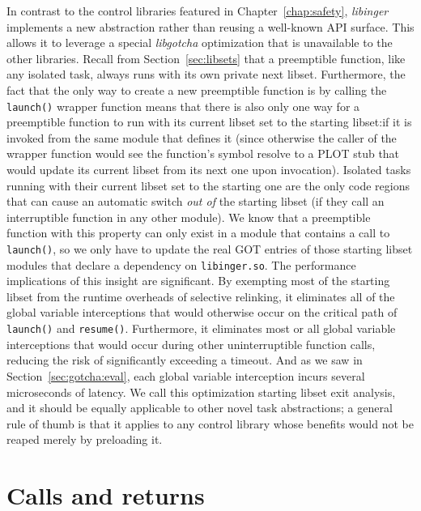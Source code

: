 In contrast to the control libraries featured in Chapter~\ref{chap:safety},
\textit{libinger} implements a new abstraction rather than reusing a well-known API
surface.  This allows it to leverage a special \textit{libgotcha} optimization that
is unavailable to the other libraries.  Recall from Section~\ref{sec:libsets} that a
preemptible function, like any isolated task, always runs with its own private next
libset.  Furthermore, the fact that the only way to create a new preemptible function
is by calling the \texttt{launch()} wrapper function means that there is also only
one way for a preemptible function to run with its current libset set to the starting
libset:\@ if it is invoked from the same module that defines it (since otherwise the
caller of the wrapper function would see the function's symbol resolve to a PLOT stub
that would update its current libset from its next one upon invocation).  Isolated
tasks running with their current libset set to the starting one are the only code
regions that can cause an automatic switch \textit{out of} the starting libset (if
they call an interruptible function in any other module).  We know that a preemptible
function with this property can only exist in a module that contains a call to
\texttt{launch()}, so we only have to update the real GOT entries of those starting
libset modules that declare a dependency on \texttt{libinger.so}.  The performance
implications of this insight are significant.  By exempting most of the starting
libset from the runtime overheads of selective relinking, it eliminates all of the
global variable interceptions that would otherwise occur on the critical path of
\texttt{launch()} and \texttt{resume()}.  Furthermore, it eliminates most or all
global variable interceptions that would occur during other uninterruptible function
calls, reducing the risk of significantly exceeding a timeout.  And as we saw in
Section~\ref{sec:gotcha:eval}, each global variable interception incurs several
microseconds of latency.  We call this optimization starting libset exit analysis,
and it should be equally applicable to other
novel task abstractions; a general rule of thumb is that it applies to any control
library whose benefits would not be reaped merely by preloading it.


\section{Calls and returns}
\label{sec:libinger:jumps}


